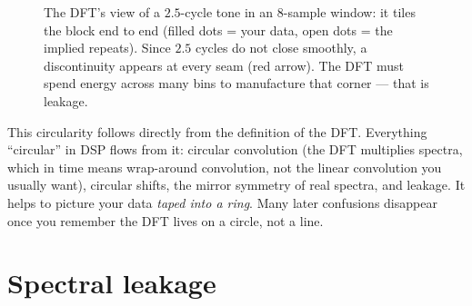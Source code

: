 \begin{figure}[H]
\centering
{}
\caption{The DFT's view of a $2.5$-cycle tone in an $8$-sample window: it tiles the
block end to end (filled dots = your data, open dots = the implied repeats). Since
$2.5$ cycles do not close smoothly, a discontinuity appears at every seam (red
arrow). The DFT must spend energy across many bins to manufacture that corner ---
that is leakage.}
\label{ch08:fig-circular}
\end{figure}

\begin{happeningbox}
This circularity follows directly from the definition of the DFT.
Everything ``circular'' in DSP flows from it: circular convolution (the DFT
multiplies spectra, which in time means wrap-around convolution, not the linear
convolution you usually want), circular shifts, the mirror symmetry of real
spectra, and leakage. It helps to picture your data \emph{taped into a
ring}. Many later confusions disappear once you remember the DFT lives on a
circle, not a line.
\end{happeningbox}

\section{Spectral leakage}
\label{ch08:leakage}

